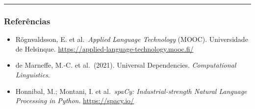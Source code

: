 \documentclass[
  brazilian,
  11pt,
]{article}
\providecommand{\tightlist}{%
  \setlength{\itemsep}{0pt}\setlength{\parskip}{0pt}}
\begin{document}
\begin{center}\rule{0.5\linewidth}{0.5pt}\end{center}

\subsubsection{Referências}\label{referuxeancias}

\begin{itemize}
\tightlist
\item
  Rögnvaldsson, E. et al.~\emph{Applied Language Technology} (MOOC).
  Universidade de Helsinque.
  \url{https://applied-language-technology.mooc.fi/}
\item
  de Marneffe, M.-C. et al.~(2021). Universal Dependencies.
  \emph{Computational Linguistics}.
\item
  Honnibal, M.; Montani, I. et al.~\emph{spaCy: Industrial-strength
  Natural Language Processing in Python}. \url{https://spacy.io/}
\end{itemize}
\end{document}

